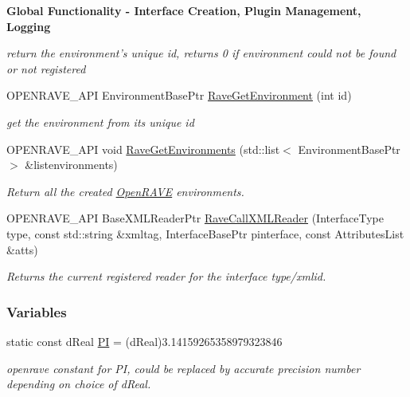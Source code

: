 \begin{Indent}{\bf Global Functionality -\/ Interface Creation, Plugin Management, Logging}
\begin{DoxyCompactItemize}
\begin{DoxyCompactList}\small\item\em return the environment's unique id, returns 0 if environment could not be found or not registered \item\end{DoxyCompactList}\item 
OPENRAVE\_\-API EnvironmentBasePtr \hyperlink{namespaceOpenRAVE_aabe395213e4bac04e7d74e4a9fb73773}{RaveGetEnvironment} (int id)
\begin{DoxyCompactList}\small\item\em get the environment from its unique id \item\end{DoxyCompactList}\item 
\hypertarget{namespaceOpenRAVE_aff4ecfea2be4239942302bae497b3c7c}{
OPENRAVE\_\-API void \hyperlink{namespaceOpenRAVE_aff4ecfea2be4239942302bae497b3c7c}{RaveGetEnvironments} (std::list$<$ EnvironmentBasePtr $>$ \&listenvironments)}
\label{namespaceOpenRAVE_aff4ecfea2be4239942302bae497b3c7c}

\begin{DoxyCompactList}\small\item\em Return all the created \hyperlink{namespaceOpenRAVE}{OpenRAVE} environments. \item\end{DoxyCompactList}\item 
OPENRAVE\_\-API BaseXMLReaderPtr \hyperlink{namespaceOpenRAVE_ad71eecb48ab2b3d6710feba24618f479}{RaveCallXMLReader} (InterfaceType type, const std::string \&xmltag, InterfaceBasePtr pinterface, const AttributesList \&atts)
\begin{DoxyCompactList}\small\item\em Returns the current registered reader for the interface type/xmlid. \item\end{DoxyCompactList}\end{DoxyCompactItemize}
\end{Indent}
\subsubsection*{Variables}
\begin{DoxyCompactItemize}
\item 
\hypertarget{namespaceOpenRAVE_a3f37499f2c749cd199222f3b02396613}{
static const dReal \hyperlink{namespaceOpenRAVE_a3f37499f2c749cd199222f3b02396613}{PI} = (dReal)3.14159265358979323846}
\label{namespaceOpenRAVE_a3f37499f2c749cd199222f3b02396613}

\begin{DoxyCompactList}\small\item\em openrave constant for PI, could be replaced by accurate precision number depending on choice of dReal. \item\end{DoxyCompactList}\end{DoxyCompactItemize}


